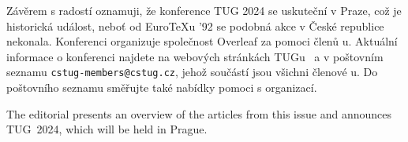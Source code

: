 \documentclass{csbulletin}
\begin{document}
Závěrem s radostí oznamuji, že konference TUG 2024 se uskuteční v Praze, což je historická událost, neboť od Euro\TeX u '92 se podobná akce v České republice nekonala. Konferenci organizuje společnost Overleaf za pomoci členů \CSTUG u. Aktuální informace o konferenci najdete na webových stránkách TUGu~\cite{tug2023tug} a v poštovním seznamu \texttt{cstug-members@cstug.cz}, jehož součástí jsou všichni členové \CSTUG u. Do poštovního seznamu směřujte také nabídky pomoci s organizací.

\printbibliography
 
\begin{summary}
The editorial presents an overview of the articles from this issue and announces TUG~2024, which will be held in Prague.
\end{summary}
\end{document}
